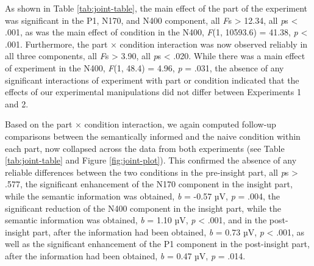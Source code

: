 \documentclass[
  english,
  doc,12pt,twoside,floatsintext]{apa7}
\begin{document}
As shown in Table \ref{tab:joint-table}, the main effect of the part of the experiment was significant in the P1, N170, and N400 component, all \emph{F}s \textgreater{} 12.34, all \emph{p}s \textless{} .001, as was the main effect of condition in the N400, \emph{F}(1, 10593.6) = 41.38, \emph{p} \textless{} .001. Furthermore, the part × condition interaction was now observed reliably in all three components, all \emph{F}s \textgreater{} 3.90, all \emph{p}s \textless{} .020. While there was a main effect of experiment in the N400, \emph{F}(1, 48.4) = 4.96, \emph{p} = .031, the absence of any significant interactions of experiment with part or condition indicated that the effects of our experimental manipulations did not differ between Experiments 1 and 2.

Based on the part × condition interaction, we again computed follow-up comparisons between the semantically informed and the naive condition within each part, now collapsed across the data from both experiments (see Table \ref{tab:joint-table} and Figure \ref{fig:joint-plot}). This confirmed the absence of any reliable differences between the two conditions in the pre-insight part, all \emph{p}s \textgreater{} .577, the significant enhancement of the N170 component in the insight part, while the semantic information was obtained, \emph{b} = -0.57 µV, \emph{p} = .004, the significant reduction of the N400 component in the insight part, while the semantic information was obtained, \emph{b} = 1.10 µV, \emph{p} \textless{} .001, and in the post-insight part, after the information had been obtained, \emph{b} = 0.73 µV, \emph{p} \textless{} .001, as well as the significant enhancement of the P1 component in the post-insight part, after the information had been obtained, \emph{b} = 0.47 µV, \emph{p} = .014.
\end{document}
